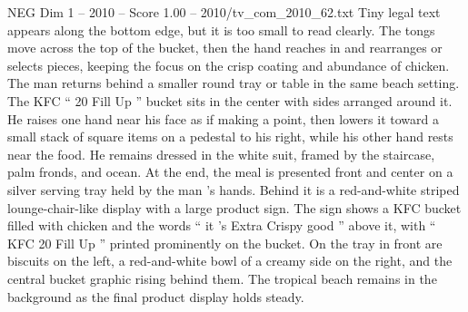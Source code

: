 \begin{textsample}{NEG Dim 1 – 2010 – Score 1.00 – 2010/tv\_com\_2010\_62.txt}
Tiny legal text appears along the bottom edge, but it is too small to read clearly.
The tongs move across the top of the bucket, then the hand reaches in and rearranges or selects pieces, keeping the focus on the crisp coating and abundance of chicken.
The man returns behind a smaller round tray or table in the same beach setting.
The KFC “ 20 Fill Up ” bucket sits in the center with sides arranged around it.
He raises one hand near his face as if making a point, then lowers it toward a small stack of square items on a pedestal to his right, while his other hand rests near the food.
He remains dressed in the white suit, framed by the staircase, palm fronds, and ocean.
At the end, the meal is presented front and center on a silver serving tray held by the man ’s hands.
Behind it is a red-and-white striped lounge-chair-like display with a large product sign.
The sign shows a KFC bucket filled with chicken and the words “ it ’s Extra Crispy good ” above it, with “ KFC 20 Fill Up ” printed prominently on the bucket.
On the tray in front are biscuits on the left, a red-and-white bowl of a creamy side on the right, and the central bucket graphic rising behind them.
The tropical beach remains in the background as the final product display holds steady.

\end{textsample}
